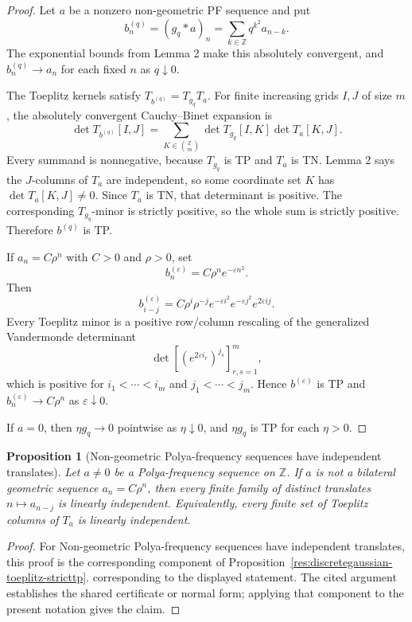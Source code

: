 \documentclass[11pt]{article}
\numberwithin{equation}{section}
\newtheorem{proposition}[theorem]{Proposition}
\theoremstyle{definition}
\theoremstyle{remark}
\newcommand{\1}{\mathbf 1}
\begin{document}
\begin{proof}
Let \(a\) be a nonzero non-geometric PF sequence and put
\[
b^{(q)}_n=(g_q*a)_n=\sum_{k\in\mathbb Z}q^{k^2}a_{n-k}.
\]
The exponential bounds from Lemma 2 make this absolutely convergent, and \(b^{(q)}_n\to a_n\) for each fixed \(n\) as \(q\downarrow0\).

The Toeplitz kernels satisfy \(T_{b^{(q)}}=T_{g_q}T_a\). For finite increasing grids \(I,J\) of size \(m\), the absolutely convergent Cauchy--Binet expansion is
\[
\det T_{b^{(q)}}[I,J]
=
\sum_{K\in{\binom{\mathbb Z}{m}}}
\det T_{g_q}[I,K]\det T_a[K,J].
\]
Every summand is nonnegative, because \(T_{g_q}\) is TP and \(T_a\) is TN. Lemma 2 says the \(J\)-columns of \(T_a\) are independent, so some coordinate set \(K\) has \(\det T_a[K,J]\neq0\). Since \(T_a\) is TN, that determinant is positive. The corresponding \(T_{g_q}\)-minor is strictly positive, so the whole sum is strictly positive. Therefore \(b^{(q)}\) is TP.

If \(a_n=C\rho^n\) with \(C>0\) and \(\rho>0\), set
\[
b^{(\varepsilon)}_n=C\rho^n e^{-\varepsilon n^2}.
\]
Then
\[
b^{(\varepsilon)}_{i-j}
=
C\rho^i\rho^{-j}e^{-\varepsilon i^2}e^{-\varepsilon j^2}e^{2\varepsilon ij}.
\]
Every Toeplitz minor is a positive row/column rescaling of the generalized Vandermonde determinant
\[
\det[(e^{2\varepsilon i_r})^{j_s}]_{r,s=1}^m,
\]
which is positive for \(i_1<\cdots<i_m\) and \(j_1<\cdots<j_m\). Hence \(b^{(\varepsilon)}\) is TP and \(b^{(\varepsilon)}_n\to C\rho^n\) as \(\varepsilon\downarrow0\).

If \(a=0\), then \(\eta g_q\to0\) pointwise as \(\eta\downarrow0\), and \(\eta g_q\) is TP for each \(\eta>0\).
\end{proof}

\begin{proposition}[Non-geometric Polya-frequency sequences have independent translates]
\label{res:pfsequence-annulus-translate-independence}
Let \(a\neq0\) be a Polya-frequency sequence on \(\mathbb Z\). If \(a\) is not a bilateral geometric sequence \(a_n=C\rho^n\), then every finite family of distinct translates \(n\mapsto a_{n-j}\) is linearly independent. Equivalently, every finite set of Toeplitz columns of \(T_a\) is linearly independent.
\end{proposition}

\begin{proof}
For Non-geometric Polya-frequency sequences have independent translates, this proof is the corresponding component of Proposition~\ref{res:discretegaussian-toeplitz-stricttp}.  corresponding to the displayed statement.  The cited argument establishes the shared certificate or normal form; applying that component to the present notation gives the claim.
\end{proof}
\end{document}
